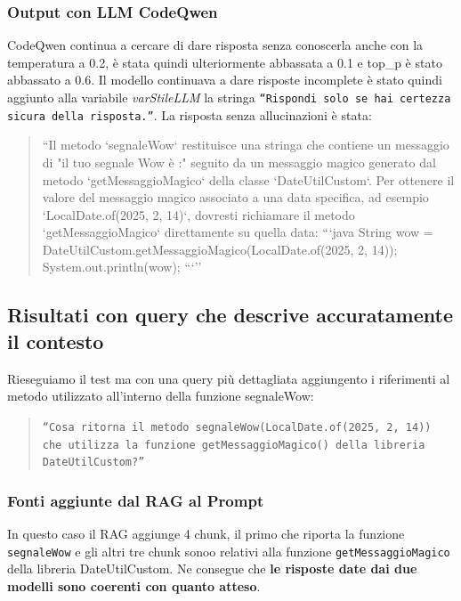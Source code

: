 \documentclass[12pt,a4paper,openright,twoside]{book}
\begin{document}
\subsubsection{Output con LLM CodeQwen}
CodeQwen continua a cercare di dare risposta senza conoscerla anche con la temperatura a 0.2, è stata quindi ulteriormente abbassata a 0.1 e top\_p è stato abbassato a 0.6.
Il modello continuava a dare risposte incomplete è stato quindi aggiunto alla variabile \emph{varStileLLM} la stringa \texttt{``Rispondi solo se hai certezza sicura della risposta.''}.
La risposta senza allucinazioni è stata:
\begin{quote}
    ``Il metodo `segnaleWow` restituisce una stringa che contiene un messaggio di "il tuo segnale Wow è :" seguito da un messaggio magico generato dal metodo `getMessaggioMagico` della classe `DateUtilCustom`.
    Per ottenere il valore del messaggio magico associato a una data specifica, ad esempio `LocalDate.of(2025, 2, 14)`, dovresti richiamare il metodo `getMessaggioMagico` direttamente su quella data:
    ```java
    String wow = DateUtilCustom.getMessaggioMagico(LocalDate.of(2025, 2, 14));
    System.out.println(wow);
    ```''
\end{quote}

\subsection{Risultati con query che descrive accuratamente il contesto}
Rieseguiamo il test ma con una query più dettagliata aggiungento i riferimenti al metodo utilizzato all'interno della funzione segnaleWow:
\begin{quote}
    \texttt{``Cosa ritorna il metodo segnaleWow(LocalDate.of(2025, 2, 14)) che utilizza la funzione getMessaggioMagico() della libreria DateUtilCustom?''}
\end{quote}
\subsubsection{Fonti aggiunte dal RAG al Prompt}
In questo caso il RAG aggiunge 4 chunk, il primo che riporta la funzione \texttt{segnaleWow} e gli altri tre chunk sonoo relativi alla funzione \texttt{getMessaggioMagico} della libreria DateUtilCustom.
Ne consegue che \textbf{le risposte date dai due modelli sono coerenti con quanto atteso}.
\end{document}
